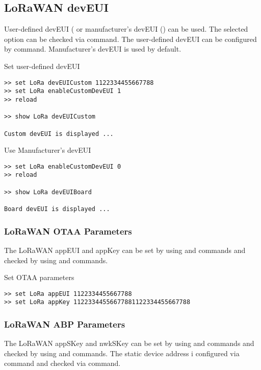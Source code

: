 \subsection{LoRaWAN devEUI}
User-defined devEUI ( or manufacturer's devEUI () can be used. The selected option can be checked via  command. The user-defined devEUI can be configured by  command. Manufacturer's devEUI is used by default.

\clearpage

\begin{docCodeExampleTitled}{Set user-defined devEUI}
\begin{verbatim}
>> set LoRa devEUICustom 1122334455667788
>> set LoRa enableCustomDevEUI 1
>> reload

>> show LoRa devEUICustom

Custom devEUI is displayed ...
\end{verbatim}
\end{docCodeExampleTitled}

\begin{docCodeExampleTitled}{Use Manufacturer's devEUI}
\begin{verbatim}
>> set LoRa enableCustomDevEUI 0
>> reload

>> show LoRa devEUIBoard

Board devEUI is displayed ...
\end{verbatim}
\end{docCodeExampleTitled}

\subsubsection{LoRaWAN OTAA Parameters}
The LoRaWAN appEUI and appKey can be set by using  and  commands and checked by using  and  commands.
  
\begin{docCodeExampleTitled}{Set OTAA parameters}
\begin{verbatim}
>> set LoRa appEUI 1122334455667788
>> set LoRa appKey 11223344556677881122334455667788
\end{verbatim}
\end{docCodeExampleTitled}
  
\subsubsection{LoRaWAN ABP Parameters}
The LoRaWAN appSKey and nwkSKey can be set by using  and  commands and checked by using  and  commands. The static device address i configured via   command and checked via   command.
  
